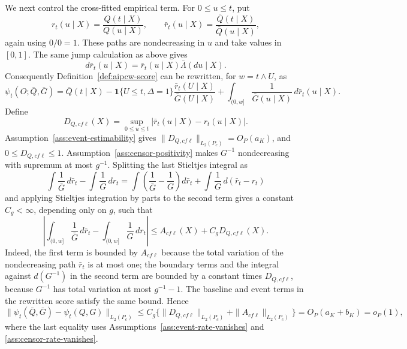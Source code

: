 We next control the cross-fitted empirical term.  For \(0\le u\le t\), put
\[
r_t(u\mid X)=\frac{Q(t\mid X)}{Q(u\mid X)},
\qquad
\bar r_t(u\mid X)=\frac{\bar Q(t\mid X)}{\bar Q(u\mid X)},
\]
again using \(0/0=1\).  These paths are nondecreasing in \(u\) and take values in \([0,1]\).  The same jump calculation as above gives
\[
d\bar r_t(u\mid X)=\bar r_t(u\mid X)\bar\Lambda(du\mid X).
\]
Consequently Definition~\ref{def:aipcw-score} can be rewritten, for \(w=t\wedge U\), as
\[
\psi_t(O;\bar Q,\bar G)
=\bar Q(t\mid X)
-\mathbf 1\{U\le t,\Delta=1\}
\frac{\bar r_t(U\mid X)}{\bar G(U\mid X)}
+\int_{(0,w]}\frac1{\bar G(u\mid X)}\,d\bar r_t(u\mid X).
\]
Define
\[
D_{Q,cf\ell}(X)=
\sup_{0\le u\le t}|\bar r_t(u\mid X)-r_t(u\mid X)|.
\]
Assumption~\ref{ass:event-estimability} gives \(\|D_{Q,cf\ell}\|_{L_2(P_c)}=O_P(a_K)\), and \(0\le D_{Q,cf\ell}\le1\).  Assumption~\ref{ass:censor-positivity} makes \(G^{-1}\) nondecreasing with supremum at most \(g^{-1}\).  Splitting the last Stieltjes integral as
\[
\int\frac1{\bar G}\,d\bar r_t-
\int\frac1G\,dr_t
=\int\left(\frac1{\bar G}-\frac1G\right)d\bar r_t
+\int\frac1G\,d(\bar r_t-r_t)
\]
and applying Stieltjes integration by parts to the second term gives a constant \(C_g<\infty\), depending only on \(g\), such that
\[
\left|
\int_{(0,w]}\frac1{\bar G}\,d\bar r_t-
\int_{(0,w]}\frac1G\,dr_t
\right|
\le A_{cf\ell}(X)+C_gD_{Q,cf\ell}(X).
\]
Indeed, the first term is bounded by \(A_{cf\ell}\) because the total variation of the nondecreasing path \(\bar r_t\) is at most one; the boundary terms and the integral against \(d(G^{-1})\) in the second term are bounded by a constant times \(D_{Q,cf\ell}\), because \(G^{-1}\) has total variation at most \(g^{-1}-1\).  The baseline and event terms in the rewritten score satisfy the same bound.  Hence
\[
\|\psi_t(\bar Q,\bar G)-\psi_t(Q,G)\|_{L_2(P_c)}
\le C_g\{
\|D_{Q,cf\ell}\|_{L_2(P_c)}+
\|A_{cf\ell}\|_{L_2(P_c)}\}
=O_P(a_K+b_K)=o_P(1),
\]
where the last equality uses Assumptions~\ref{ass:event-rate-vanishes} and \ref{ass:censor-rate-vanishes}.


